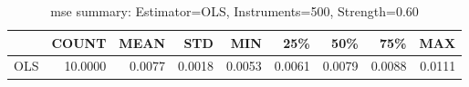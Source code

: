 \begin{table}[ht]
\centering
\caption{mse summary: Estimator=OLS, Instruments=500, Strength=0.60}
\begin{tabular}{lrrrrrrrr}
\toprule
 & COUNT & MEAN & STD & MIN & 25\% & 50\% & 75\% & MAX \\
\midrule
OLS & 10.0000 & 0.0077 & 0.0018 & 0.0053 & 0.0061 & 0.0079 & 0.0088 & 0.0111 \\
\bottomrule
\end{tabular}
\end{table}
